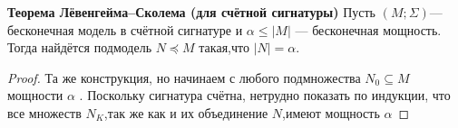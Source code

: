 \begin{theorem}\textbf{Теорема Лёвенгейма–Сколема (для счётной сигнатуры)}
	Пусть $(M ;\Sigma)$— бесконечная модель в счётной сигнатуре и $\alpha \leq |M|$
	— бесконечная мощность. Тогда найдётся подмодель $N \preceq M$ такая,что $|N|=\alpha$.
\end{theorem}
\begin{proof}
	Та же конструкция, но начинаем с любого подмножества $N_0\subseteq M$
	мощности $\alpha$ . Поскольку сигнатура счётна, нетрудно показать по индукции, что все множеств $N_K$,так же
	как и их объединение $N$,имеют мощность $\alpha$ 
\end{proof}
